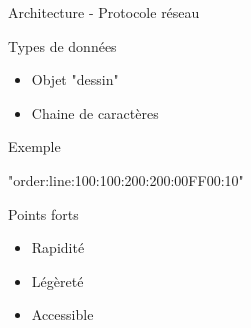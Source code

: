 \documentclass{beamer}
\begin{document}
		\begin{frame}{Architecture - Protocole réseau}
			\begin{block}{Types de données}
				\begin{itemize}
					\item Objet "dessin"
					\item Chaine de caractères
				\end{itemize}
			\end{block}
			\pause
			\begin{block}{Exemple}
				\begin{center}"order:line:100:100:200:200:00FF00:10"\end{center}
			\end{block}
			\pause
			\begin{block}{Points forts}
				\begin{itemize}
					\item Rapidité
					\item Légèreté
					\item Accessible
				\end{itemize}
			\end{block}
		\end{frame}
		
\end{document}
